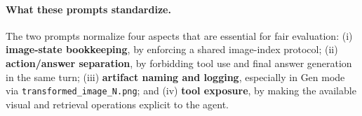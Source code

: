 \documentclass[runningheads]{llncs}
\theoremstyle{plain}
\theoremstyle{definition}
\theoremstyle{remark}
\begin{document}
\paragraph{What these prompts standardize.}
The two prompts normalize four aspects that are essential for fair evaluation:
(i) \textbf{image-state bookkeeping}, by enforcing a shared image-index protocol;
(ii) \textbf{action/answer separation}, by forbidding tool use and final answer generation in the same turn;
(iii) \textbf{artifact naming and logging}, especially in Gen mode via \texttt{transformed\_image\_N.png}; and
(iv) \textbf{tool exposure}, by making the available visual and retrieval operations explicit to the agent.
\end{document}
